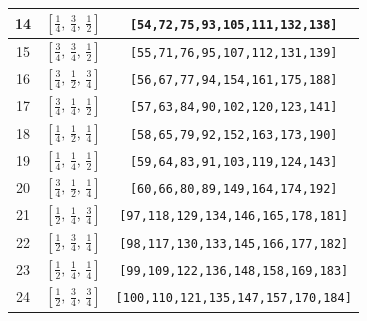 \documentclass[fleqn,8pt]{jsarticle}
\begin{document}
\begin{longtable}{ccc}
14 & $\left[ \frac{1}{4},\, \frac{3}{4},\, \frac{1}{2} \right]$ & {\tt [54,72,75,93,105,111,132,138]} \\ \hline
15 & $\left[ \frac{3}{4},\, \frac{3}{4},\, \frac{1}{2} \right]$ & {\tt [55,71,76,95,107,112,131,139]} \\ \hline
16 & $\left[ \frac{3}{4},\, \frac{1}{2},\, \frac{3}{4} \right]$ & {\tt [56,67,77,94,154,161,175,188]} \\ \hline
17 & $\left[ \frac{3}{4},\, \frac{1}{4},\, \frac{1}{2} \right]$ & {\tt [57,63,84,90,102,120,123,141]} \\ \hline
18 & $\left[ \frac{1}{4},\, \frac{1}{2},\, \frac{1}{4} \right]$ & {\tt [58,65,79,92,152,163,173,190]} \\ \hline
19 & $\left[ \frac{1}{4},\, \frac{1}{4},\, \frac{1}{2} \right]$ & {\tt [59,64,83,91,103,119,124,143]} \\ \hline
20 & $\left[ \frac{3}{4},\, \frac{1}{2},\, \frac{1}{4} \right]$ & {\tt [60,66,80,89,149,164,174,192]} \\ \hline
21 & $\left[ \frac{1}{2},\, \frac{1}{4},\, \frac{3}{4} \right]$ & {\tt [97,118,129,134,146,165,178,181]} \\ \hline
22 & $\left[ \frac{1}{2},\, \frac{3}{4},\, \frac{1}{4} \right]$ & {\tt [98,117,130,133,145,166,177,182]} \\ \hline
23 & $\left[ \frac{1}{2},\, \frac{1}{4},\, \frac{1}{4} \right]$ & {\tt [99,109,122,136,148,158,169,183]} \\ \hline
24 & $\left[ \frac{1}{2},\, \frac{3}{4},\, \frac{3}{4} \right]$ & {\tt [100,110,121,135,147,157,170,184]} \\
\end{longtable}
\renewcommand{\arraystretch}{1.2}
\end{document}
